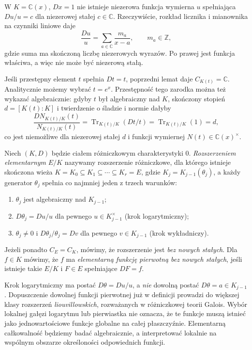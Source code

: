 \begin{przyklad}
\label{aa:prz:exponential-extension}
W $K=\mathbb C(x)$, $Dx=1$ nie istnieje
niezerowa funkcja wymierna $u$ spełniająca
$Du/u=c$ dla niezerowej stałej $c\in\mathbb C$.
Rzeczywiście, rozkład licznika i mianownika
na czynniki liniowe daje
\[
\frac{Du}{u}
=\sum_{a\in\mathbb C}\frac{m_a}{x-a},
\qquad m_a\in\mathbb Z,
\]
gdzie suma ma skończoną liczbę niezerowych wyrazów.
Po prawej jest funkcja właściwa, a więc
nie może być niezerową stałą.

Jeśli przestępny element $t$ spełnia
$Dt=t$, poprzedni lemat daje
$C_{K(t)}=\mathbb C$.
Analitycznie możemy wybrać $t=e^x$.
Przestępność tego zarodka można też wykazać
algebraicznie: gdyby $t$ był algebraiczny
nad $K$, skończony stopień $d=[K(t):K]$
i twierdzenie o śladzie i normie dałyby
\[
\frac{DN_{K(t)/K}(t)}{N_{K(t)/K}(t)}
=\operatorname{Tr}_{K(t)/K}(Dt/t)
=\operatorname{Tr}_{K(t)/K}(1)=d,
\]
co jest niemożliwe dla niezerowej stałej $d$
i funkcji wymiernej $N(t)\in\mathbb C(x)^\times$.
\end{przyklad}

\begin{definicja}
\label{aa:def:elementary-differential-extension}
Niech $(K,D)$ będzie ciałem różniczkowym
charakterystyki $0$.
\emph{Rozszerzeniem elementarnym} $E/K$
nazywamy rozszerzenie różniczkowe, dla
którego istnieje skończona wieża
$K=K_0\subseteq K_1\subseteq\cdots\subseteq K_r=E$,
gdzie $K_j=K_{j-1}(\theta_j)$, a każdy
generator $\theta_j$ spełnia co najmniej
jeden z trzech warunków:
\begin{enumerate}
\item $\theta_j$ jest algebraiczny nad $K_{j-1}$;
\item $D\theta_j=Du/u$ dla pewnego
      $u\in K_{j-1}^\times$ (krok logarytmiczny);
\item $\theta_j\ne0$ i
      $D\theta_j/\theta_j=Dv$ dla pewnego
      $v\in K_{j-1}$ (krok wykładniczy).
\end{enumerate}
Jeżeli ponadto $C_E=C_K$, mówimy, że
rozszerzenie jest \emph{bez nowych stałych}.
Dla $f\in K$ mówimy, że $f$ ma
\emph{elementarną funkcję pierwotną bez nowych stałych},
jeśli istnieje takie $E/K$ i $F\in E$
spełniające $DF=f$.
\end{definicja}

\begin{uwaga}
\label{aa:uw:elementary-versus-liouvillian}
Krok logarytmiczny ma postać
$D\theta=Du/u$, a \emph{nie} dowolną postać
$D\theta=a\in K_{j-1}$. Dopuszczenie dowolnej
funkcji pierwotnej już w definicji
prowadzi do większej klasy rozszerzeń
\emph{liouvillowskich}, rozważanych w
różniczkowej teorii Galois.
Wybór lokalnej gałęzi logarytmu lub
pierwiastka nie oznacza, że te funkcje
muszą istnieć jako jednowartościowe
funkcje globalne na całej płaszczyźnie.
Elementarną całkowalność będziemy
badać algebraicznie, a interpretować
lokalnie na wspólnym obszarze
określoności odpowiednich funkcji.
\end{uwaga}


